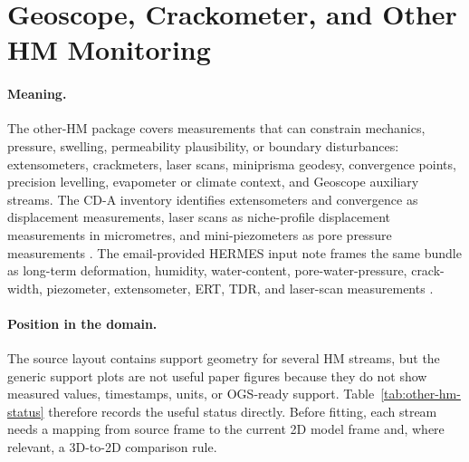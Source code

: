\FloatBarrier
\section{Geoscope, Crackometer, and Other HM Monitoring}
\label{sec:measurement-other-hm}

\paragraph{Meaning.}
The other-HM package covers measurements that can constrain mechanics, pressure,
swelling, permeability plausibility, or boundary disturbances: extensometers,
crackmeters, laser scans, miniprisma geodesy, convergence points, precision
levelling, evapometer or climate context, and Geoscope auxiliary streams.  The CD-A
inventory identifies extensometers and convergence as displacement measurements,
laser scans as niche-profile displacement measurements in micrometres, and
mini-piezometers as pore pressure measurements \citep[Table~1]{Ziefle2024Characterization}.
The email-provided HERMES input note frames the same bundle as long-term deformation,
humidity, water-content, pore-water-pressure, crack-width, piezometer,
extensometer, ERT, TDR, and laser-scan measurements \citep[PDF p.~5]{HermesInput2024Email}.

\paragraph{Position in the domain.}
The source layout contains support geometry for several HM streams, but the generic
support plots are not useful paper figures because they do not show measured
values, timestamps, units, or OGS-ready support.  Table~\ref{tab:other-hm-status}
therefore records the useful status directly.  Before fitting, each stream needs a
mapping from source frame to the current 2D model frame and, where relevant, a
3D-to-2D comparison rule.

